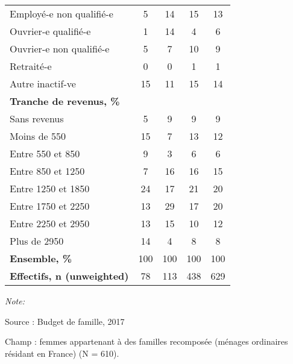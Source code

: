 \documentclass[
  12pt,
]{book}
\begin{document}
\begin{table}[!h]
{\begin{threeparttable}
\begin{tabular}[t]{lcccc}
\addlinespace
\hspace{1em}Employé-e non qualifié-e & 5 & 14 & 15 & 13\\
\hspace{1em}Ouvrier-e qualifié-e & 1 & 14 & 4 & 6\\
\hspace{1em}Ouvrier-e non qualifié-e & 5 & 7 & 10 & 9\\
\hspace{1em}Retraité-e & 0 & 0 & 1 & 1\\
\hspace{1em}Autre inactif-ve & 15 & 11 & 15 & 14\\
\addlinespace
\textbf{Tranche de revenus, \%} &  &  &  & \\
\hspace{1em}Sans revenus & 5 & 9 & 9 & 9\\
\hspace{1em}Moins de 550 & 15 & 7 & 13 & 12\\
\hspace{1em}Entre 550 et 850 & 9 & 3 & 6 & 6\\
\hspace{1em}Entre 850 et 1250 & 7 & 16 & 16 & 15\\
\addlinespace
\hspace{1em}Entre 1250 et 1850 & 24 & 17 & 21 & 20\\
\hspace{1em}Entre 1750 et 2250 & 13 & 29 & 17 & 20\\
\hspace{1em}Entre 2250 et 2950 & 13 & 15 & 10 & 12\\
\hspace{1em}Plus de 2950 & 14 & 4 & 8 & 8\\
\textbf{Ensemble, \%} & 100 & 100 & 100 & 100\\
\addlinespace
\textbf{Effectifs, n (unweighted)} & 78 & 113 & 438 & 629\\
\bottomrule
\end{tabular}
\begin{tablenotes}
\item \textit{Note: } 
\item Source : Budget de famille, 2017
\item Champ : femmes appartenant à des familles recomposée (ménages ordinaires résidant en France) (N = 610).
\end{tablenotes}
\end{threeparttable}}
\end{table}
\end{document}
